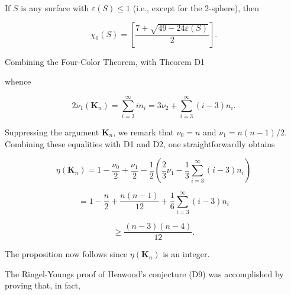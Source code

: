 If $S$ is any surface with $\varepsilon(S) \leq 1$ (i.e., except for the 2-sphere), then

$$\chi_0(S) = \left[ \frac{7 + \sqrt{49 - 24\varepsilon(S)}}{2} \right].$$

Combining the Four-Color Theorem, with Theorem D1

whence

$$2\nu_1(\mathbf{K}_n) = \sum_{i=3}^{\infty} in_i = 3\nu_2 + \sum_{i=3}^{\infty} (i-3)n_i.$$

Suppressing the argument $\mathbf{K}_n$, we remark that $\nu_0 = n$ and $\nu_1 = n(n-1)/2$. Combining these equalities with D1 and D2, one straightforwardly obtains

$$\eta(\mathbf{K}_n) = 1 - \frac{\nu_0}{2} + \frac{\nu_1}{2} - \frac{1}{2} \left( \frac{2}{3} \nu_1 - \frac{1}{3} \sum_{i=3}^{\infty} (i-3)n_i \right)$$

$$= 1 - \frac{n}{2} + \frac{n(n-1)}{12} + \frac{1}{6} \sum_{i=3}^{\infty} (i-3)n_i$$

$$\geq \frac{(n-3)(n-4)}{12}.$$

The proposition now follows since $\eta(\mathbf{K}_n)$ is an integer.

The Ringel-Youngs proof of Heawood's conjecture (D9) was accomplished by proving that, in fact,
